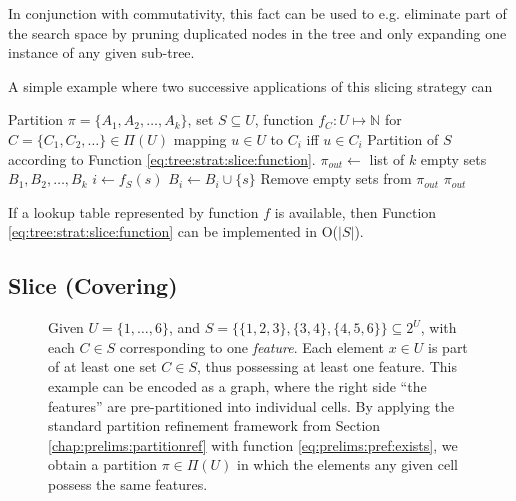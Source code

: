 			In conjunction with commutativity, this fact can be used to e.g. eliminate part of the search space by pruning duplicated nodes in the tree and only expanding one instance of any given sub-tree.

			A simple example where two successive applications of this slicing strategy can

			\begin{algorithm}[ht!]
				\centering
				\begin{algorithmic}
					\Require Partition $\pi = \{ A_1, A_2, \ldots, A_k \}$, set $S \subseteq U$, function $f_C: U \mapsto \mathbb{N}$ for $C = \{ C_1, C_2, \ldots \} \in \Pi(U)$ mapping $u \in U$ to $C_i$ iff $u \in C_i$
					\Ensure Partition of $S$ according to Function \ref{eq:tree:strat:slice:function}.
					\Statex
						\State $\pi_{out} \gets$ list of $k$ empty sets $B_1, B_2, \ldots, B_k$
							\State $i \gets f_S(s)$
							\State $B_i \gets B_i \cup \{ s \}$
						\EndFor
						\State Remove empty sets from $\pi_{out}$
						\State \Return $\pi_{out}$
					\EndFunction
				\end{algorithmic}
				\caption{If a lookup table represented by function $f$ is available, then Function \ref{eq:tree:strat:slice:function} can be implemented in O($|S|$).}
				\label{algo:tree:strat:slice}
			\end{algorithm}

			\FloatBarrier
			\clearpage

		\subsection{Slice (Covering)}

			\begin{figure}[ht!]
				\centering
				
				\caption{Given $U = \{ 1, \ldots, 6 \}$, and $S = \{ \{ 1, 2, 3 \}, \{ 3, 4 \}, \{ 4, 5, 6 \} \} \subseteq 2^U$, with each $C \in S$ corresponding to one \textit{feature}.
				Each element $x \in U$ is part of at least one set $C \in S$, thus possessing at least one feature.
				This example can be encoded as a graph, where the right side \enquote{the features} are pre-partitioned into individual cells. By applying the standard partition refinement framework from Section \ref{chap:prelims:partitionref} with function \ref{eq:prelims:pref:exists}, we obtain a partition $\pi \in \Pi(U)$ in which the elements any given cell possess the same features.}
				\label{fig:tree:strat:cov}
			\end{figure}

